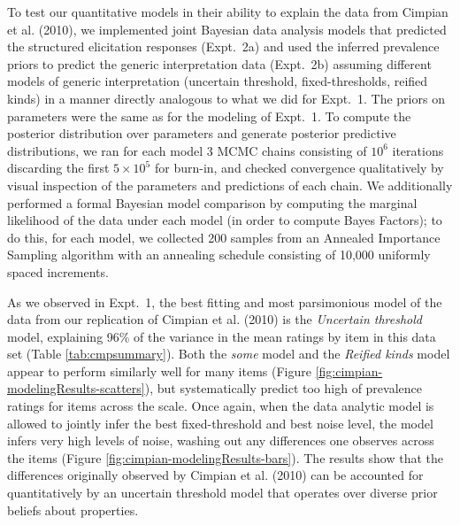 \documentclass[floatsintext,man]{apa6}
\begin{document}
To test our quantitative models in their ability to explain the data from Cimpian et al. (2010), we implemented joint Bayesian data analysis models that predicted the structured elicitation responses (Expt.~2a) and used the inferred prevalence priors to predict the generic interpretation data (Expt.~2b) assuming different models of generic interpretation (uncertain threshold, fixed-thresholds, reified kinds) in a manner directly analogous to what we did for Expt.~1. 
The priors on parameters were the same as for the modeling of Expt.~1. 
To compute the posterior distribution over parameters and generate posterior predictive distributions, we ran for each model 3 MCMC chains consisting of $10^6$ iterations discarding the first $5 \times 10^5$ for burn-in, and checked convergence qualitatively by visual inspection of the parameters and predictions of each chain. 
We additionally performed a formal Bayesian model comparison by computing the marginal likelihood of the data under each model (in order to compute Bayes Factors); to do this, for each model, we collected 200 samples from an Annealed Importance Sampling algorithm with an annealing schedule consisting of 10,000 uniformly spaced increments. 

As we observed in Expt.~1, the best fitting and most parsimonious model of the data from our replication of Cimpian et al. (2010) is the \emph{Uncertain threshold} model, explaining 96\% of the variance in the mean ratings by item in this data set (Table \ref{tab:cmpsummary}).
Both the \emph{some} model and the \emph{Reified kinds} model appear to perform similarly well for many items (Figure \ref{fig:cimpian-modelingResults-scatters}), but systematically predict too high of prevalence ratings for items across the scale. 
Once again, when the data analytic model is allowed to jointly infer the best fixed-threshold and best noise level, the model infers very high levels of noise, washing out any differences one observes across the items (Figure \ref{fig:cimpian-modelingResults-bars}).
The results show that the differences originally observed by Cimpian et al. (2010) can be accounted for quantitatively by an uncertain threshold model that operates over diverse prior beliefs about properties.

\end{document}
